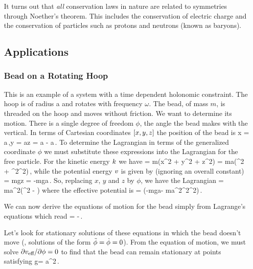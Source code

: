 \begin{note}
It turns out that \emph{all} conservation laws in nature are related to symmetries through Noether's theorem. This includes the conservation of electric charge and the conservation of particles such as protons and neutrons (known as baryons).
\end{note}


\subsection{Applications}

\subsubsection{Bead on a Rotating Hoop}
This is an example of a system with a time dependent holonomic constraint. The hoop is of radius a and rotates with frequency $\omega$. The bead, of mass $m$, is threaded on the hoop and moves without friction. We want to determine its motion. There is a single degree of freedom $\phi$, the angle the bead makes with the vertical. In terms of Cartesian coordinates $\left[{x,y,z}\right]$ the position of the bead is
\beq
x = a\sin\vat\phi\cos{}\,,\quad y = a\sin\vat\phi\sin{}\quad{}\quad z = a - a\cos\vat\phi\,.
\eeq
To determine the Lagrangian in terms of the generalized coordinate $\phi$ we must substitute these expressions into the Lagrangian for the free particle. For the kinetic energy $k$ we have
\beq
\ken = m\left(x^2 + y^2 + z^2\right) = ma\left(\dt\phi^2 + \omega^2\sin^2\vat{\phi}\right)\,,
\eeq
while the potential energy $v$ is given by (ignoring an overall constant)
\beq
\pen = mgz = -mga\cos\vat\phi\,.
\eeq
So, replacing $x$, $y$ and $z$ by $\phi$, we have the Lagrangian
\beq
\lag = ma^2\left(\dt\phi^2 - \pen{}\right)
\eeq
where the effective potential is
\beq
\pen{} = \left(-mga\cos\vat\phi -  ma^2\omega^2\sin^2\vat\phi\right)\,.
\eeq

We can now derive the equations of motion for the bead simply from Lagrange's equations which read
\beq
\ddt\phi = -\,.
\eeq

Let's look for stationary solutions of these equations in which the bead doesn't move (\ie, solutions of the form $\ddot{\phi} = \dot{\phi} = 0$). From the equation of motion, we must solve $\partial v_\text{eff}/\partial\phi = 0$ to find that the bead can remain stationary at points satisfying
\beq
g\sin\vat\phi = a\omega^2\sin\vat\phi\cos\vat\phi\,.
\eeq

